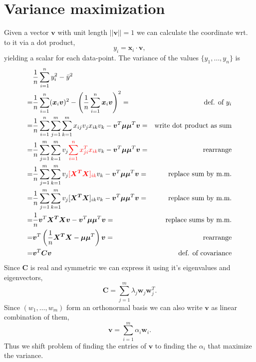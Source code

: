 \section{Variance maximization}
Given a vector $\bm{v}$ with unit length  $||\bm{v}||=1$ we can calculate the 
coordinate wrt. to it via a dot product,
\begin{equation}
    y_i = \bm{x}_i \cdot \bm{v}, 
\end{equation}
yielding a scalar for each data-point.
The variance of the values $\{y_1, \hdots, y_n\}$ is 
\begin{align}
    &\frac{1}{n} \sum_{i=1}^n y_i^2 - \bar{y}^2 \\
    =& \frac{1}{n} \sum_{i=1}^n (\bm{x}_i \bm{v})^2 - \left(\frac{1}{n} \sum_{i=1}^n \bm{x}_i\bm{v}\right)^2 =& \text{def. of $y_i$} \\
    =&\frac{1}{n} \sum_{i=1}^n \sum_{j=1}^m \sum_{k=1}^m x_{ij} v_j x_{ik} v_k - \bm{v}^T \bm{\mu} \bm{\mu}^T \bm{v} =&\text{write dot product as sum}\\
    =&\frac{1}{n}  \sum_{j=1}^m \sum_{k=1}^m v_j  {\color{red} \sum_{i=1}^n x^T_{ji}  x_{ik}} v_k - \bm{v}^T \bm{\mu} \bm{\mu}^T \bm{v} =&\text{rearrange}\\
    =&\frac{1}{n}  \sum_{j=1}^m \sum_{k=1}^m v_j  {\color{red} [\bm{X^T X}]_{ik}} v_k - \bm{v}^T \bm{\mu} \bm{\mu}^T \bm{v} =&\text{replace sum by m.m.}\\
    =&\frac{1}{n}  \sum_{j=1}^m \sum_{k=1}^m v_j  [\bm{X^T X}]_{ik} v_k - \bm{v}^T \bm{\mu} \bm{\mu}^T \bm{v} =&\text{replace sum by m.m.}\\
    =&\frac{1}{n}  \bm{v}^T \bm{X^T X} \bm{v}- \bm{v}^T \bm{\mu} \bm{\mu}^T \bm{v} =&\text{replace sums by m.m.}\\
    =&\bm{v}^T \left(\frac{1}{n}\bm{X^T X} - \bm{\mu} \bm{\mu}^T \right) \bm{v} =&\text{rearrange}\\
    =&\bm{v}^T \bm{C} \bm{v} & \text{def. of covariance}
\end{align}
Since $\bm{C}$ is real and symmetric we can express it using it's eigenvalues and eigenvectors,
\begin{equation}
    \bm{C} = \sum_{j=1}^m \lambda_j \bm{w}_j \bm{w}_j^T.
\end{equation}
Since $(w_1, \hdots, w_m)$ form an orthonormal basis we can also write $\bm{v}$ as linear combination of them,
\begin{equation}
    \bm{v} = \sum_{i=1}^m \alpha_i \bm{w}_i.
\end{equation}
Thus we shift problem of finding the entries of $\bm{v}$ to finding the $\alpha_i$ that maximize the variance.
